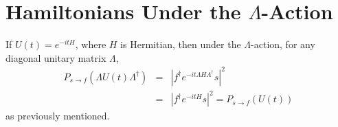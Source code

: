\documentclass[twocolumn,superscriptaddress]{revtex4-1}
\theoremstyle{plain}
\theoremstyle{definition}
\theoremstyle{definition}
\theoremstyle{definition}
\theoremstyle{definition}
\theoremstyle{definition}
\theoremstyle{definition}
\begin{document}
\begin{comment}
For a unitary matrix $U$,we want to know if there is a $\Theta$ such that $\Theta\odot U=U^T$. One can immediately deduce that $\Theta_{ii}=1$ and $\Theta_{ij}=\Theta^{-1}_{ji}$ which implies $\Theta$ is Hermitian.

We require that $\Theta\odot U$ be unitary. Let $U$ be $n\times n$. Then \begin{equation}\sum_{j=1}^n{u_{ij}\overline{u_{kj}}\Theta_{ij}\overline{\Theta_{kj}}}=\delta_{ik}.\end{equation} The first possibility is that $\Theta_{ij}u_{ij}=\overline{u_{ij}}$ for all $i,j$. Then $\Theta\odot U=\overline{U}$. This can be thought of as conjugation by the antiunitary operator $K_U$ in the basis of $U$. This antiunitary operator depends on choice of $U$. However, we suppress the subscript on the operator as the meaning should be clear.

Now suppose that $\Theta\ne KM$ for some matrix $M$. In particular, this implies that the operation of taking the Hadamard product with $\Theta$ is a linear map. Note that the vector $(u_{i1}\overline{u_{k1}},\dots,u_{in}\overline{u_{kn}})$ for $i\ne k$ is normal to the vector $(1,\dots,1)$. So the vector $(\Theta_{i1}\overline{\Theta}_{k1},\dots,\Theta_{in}\overline{\Theta}_{kn})$ is in the span of $(1,\dots,1)$. Now we have $\Theta_{ij}\overline{\Theta}_{kj}=\Theta_{ij'}\overline{\Theta}_{kj'}$ for $1\le j,j'\le n$. The first possibility is that $\Theta_{ij}=\alpha_i$ for each $i\in[n]$. Then this amounts to saying that $|U_{sf}|^2=|DU_{sf}|^2$, where $D$ is a diagonal unitary matrix. Another case is that $\Theta_{ij}$ are equal or $\Theta_{ij}=e^{i(\alpha_i-\alpha_j)}$ for all $i,j$. But then either $\Theta\odot U=e^{i\alpha I}U$ or $\Theta\odot U=\Lambda U\Lambda^\dagger$ where $\Lambda$ is a diagonal unitary matrix. Then 

 In conclusion, if there is a $\Theta$ such that $\Theta\odot U=U^T$, then there is a matrix $g$ in the group generated by $K$ and the diagonal unitaries such that $e^{i\alpha I}gUg^\dagger=U^T$ for some $\alpha\in\mathbb{R}$. So to understand when the quantum probability current vanishes, we need to understand these three basic actions.
\end{comment}

\section{Hamiltonians Under the $\Lambda$-Action}\label{sec:bipartite}
If $U(t)=e^{-itH}$, where $H$ is Hermitian, then under the $\Lambda$-action, for any diagonal unitary matrix $\Lambda$, 
\begin{eqnarray}
P_{s\to f}(\Lambda U(t)\Lambda^\dagger)&=&|f^\dagger e^{-it\Lambda H\Lambda^\dagger}s|^2\\
&=&|f^\dagger e^{-itH}s|^2=P_{s\to f}(U(t))\nonumber
\end{eqnarray}
\noindent as previously mentioned.
\end{document}
